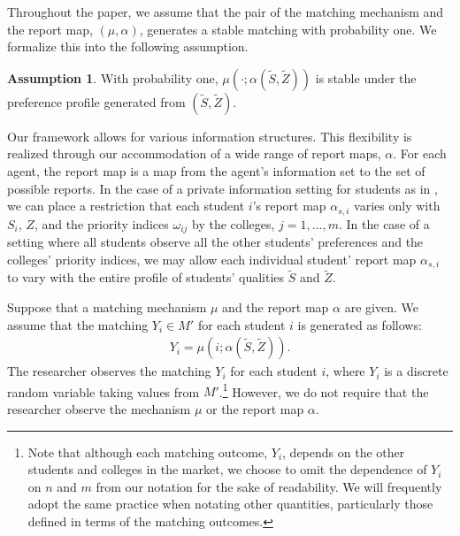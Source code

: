 \documentclass[12pt, fullpage]{amsart}
\theoremstyle{definition}
\theoremstyle{definition}
\newtheorem{assumption}{Assumption}[section]
\theoremstyle{definition}
\begin{document}
\begin{bibunit}[econometrica]
Throughout the paper, we assume that the pair of the matching mechanism and the report map, $(\mu,\alpha)$, generates a stable matching with probability one. We formalize this into the following assumption.

\begin{assumption}
	\label{assump: stable matching}
	With probability one, $\mu(\cdot; \alpha(\tilde S, \tilde Z))$ is stable under the preference profile generated from $(\tilde S, \tilde Z)$.
\end{assumption}

Our framework allows for various information structures. This flexibility is realized through our accommodation of a wide range of report maps, $\alpha$. For each agent, the report map is a map from the agent's information set to the set of possible reports. In the case of a private information setting for students as in \cite{Fack/Grenet/He:AER:2019}, we can place a restriction that each student $i$'s report map $\alpha_{s,i}$ varies only with $S_i$, $Z$, and the priority indices $\omega_{ij}$ by the colleges, $j=1,...,m$. In the case of a setting where all students observe all the other students' preferences and the colleges' priority indices, we may allow each individual student' report map $\alpha_{s,i}$ to vary with the entire profile of students' qualities $\tilde S$ and $\tilde Z$.

Suppose that a matching mechanism $\mu$ and the report map $\alpha$ are given. We assume that the matching $Y_i \in M'$ for each student $i$ is generated as follows:
\begin{align}
	\label{Yi}
	Y_i = \mu(i; \alpha(\tilde S, \tilde Z)).
\end{align}
The researcher observes the matching $Y_i$ for each student $i$, where $Y_i$ is a discrete random variable taking values from $M'$.\footnote{Note that although each matching outcome, $Y_{i}$, depends on the other students and colleges in the market, we choose to omit the dependence of $Y_{i}$ on $n$ and $m$ from our notation for the sake of readability. We will frequently adopt the same practice when notating other quantities, particularly those defined in terms of the matching outcomes.} However, we do not require that the researcher observe the mechanism $\mu$ or the report map $\alpha$.


\end{bibunit}
\end{document}
